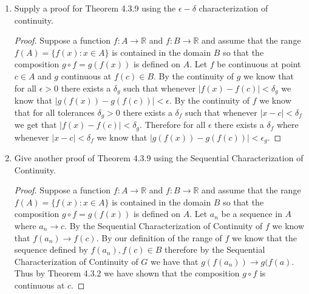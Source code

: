 \documentclass[12pt]{article}
\makeatletter
\theoremstyle{homework}
\newenvironment{exercise}[1]
{\def\@currentlabel{#1}\exercisecore}
{\endexercisecore}
\newcommand{\Reals}{\ensuremath{\mathbb R}}
\makeatother
\begin{document}
\begin{exercise}{Abbott 4.3.3} 
  \begin{enumerate}
    \item Supply a proof for Theorem 4.3.9 using the $\epsilon - \delta$ characterization of continuity.\\
    \begin{proof}
      Suppose a function $f: A \to \Reals$ and $f: B \to \Reals$ and assume that the range $f(A) = \{f(x): x \in A\}$ is contained in the 
      domain $B$ so that the composition $g \circ f = g(f(x))$ is defined on $A$. Let $f$ be continuous at point $c \in A$ and $g$ continuous at 
      $f(c) \in B$. By the continuity of $g$ we know that for all $\epsilon > 0$ there exists a $\delta_g$ such that 
      whenever $|f(x) - f(c)|< \delta_g$ we know that $|g(f(x)) - g(f(c))|<\epsilon$.
      By the continuity of $f$ we know that for all tolerances $\delta_g > 0$ there exists a $\delta_f$ such that
      whenever $|x - c|< \delta_f$ we get that $|f(x) - f(c)| < \delta_g$.
     Therefore for all $\epsilon$ there exists a $\delta_f$ where whenever $|x - c|< \delta_f$ we know that $|g(f(x)) - g(f(c))|<\epsilon_g$.
    \end{proof}
    \vspace{.25in}


    \item Give another proof of Theorem 4.3.9 using the Sequential Characterization of Continuity.\\
    \begin{proof}
      Suppose a function $f: A \to \Reals$ and $f: B \to \Reals$ and assume that the range $f(A) = \{f(x): x \in A\}$ is contained in the 
      domain $B$ so that the composition $g \circ f = g(f(x))$ is defined on $A$. Let $a_n$ be a sequence in $A$ where $a_n \to c$. By the
      Sequential Characterization of Continuity of $f$ we know that $f(a_n) \to f(c)$. By our definition of the range of $f$ we know that the sequence defined by 
      $f(a_n), f(c) \in B$ therefore by the Sequential Characterization of Continuity of $G$ we have that $g(f(a_n)) \to g(f(a)$. Thus by Theorem 4.3.2 we have shown that the composition $g\circ f$ is continuous at $c$.  
    \end{proof}
    \end{enumerate}
\end{exercise}
\vspace{.5in}
\end{document}
